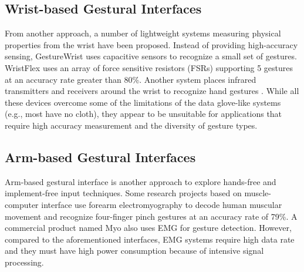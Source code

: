 \documentclass{sigchi}
\begin{document}
\subsection{Wrist-based Gestural Interfaces}


From another approach, a number of lightweight systems measuring physical properties from the wrist have been proposed. Instead of providing high-accuracy sensing, GestureWrist \cite{Rekimoto:2001:GGU:580581.856565} uses capacitive sensors to recognize a small set of gestures. WristFlex \cite{Dementyev:2014:WLG:2642918.2647396} uses an array of force sensitive resistors (FSRs) supporting 5 gestures at an accuracy rate greater than 80\%. Another system places infrared transmitters and receivers around the wrist to recognize hand gestures \cite{Fukui:2011:HSC:2030112.2030154}. While all these devices overcome some of the limitations of the data glove-like systems (e.g., most have no cloth), they appear to be unsuitable for applications that require high accuracy measurement and the diversity of gesture types. 


\subsection{Arm-based Gestural Interfaces}

Arm-based gestural interface is another approach to explore hands-free and implement-free input techniques. Some research projects based on muscle-computer interface \cite{Saponas:2009:EAI:1622176.1622208} use forearm electromyography to decode human muscular movement and recognize four-finger pinch gestures at an accuracy rate of 79\%. A commercial product named Myo \cite{Myo} also uses EMG for gesture detection. However, compared to the aforementioned interfaces, EMG systems require high data rate and they must have high power consumption because of intensive signal processing.  
\end{document}
